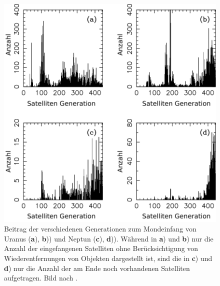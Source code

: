 \documentclass[12pt,a4paper,twoside,open=right,bibliography=totoc]{scrbook}
\renewcommand{\cite}{ \citep}
\begin{document}
\begin{figure}[tbn]
\centering
\includegraphics[scale=0.4]{img/Nesvorny2007-8}
\caption{Beitrag der verschiedenen Generationen zum Mondeinfang von Uranus (\textbf{a}), \textbf{b})) und Neptun (\textbf{c}), \textbf{d})). Während in \textbf{a}) und \textbf{b}) nur die Anzahl der eingefangenen Satelliten ohne Berücksichtigung von Wiederentfernungen von Objekten dargestellt ist, sind die in  \textbf{c}) und \textbf{d}) nur die Anzahl der am Ende noch vorhandenen Satelliten aufgetragen. Bild nach \cite{Nesvorny2007}.} %
\label{fig:Mondgenerationen}
\end{figure}
\end{document}
